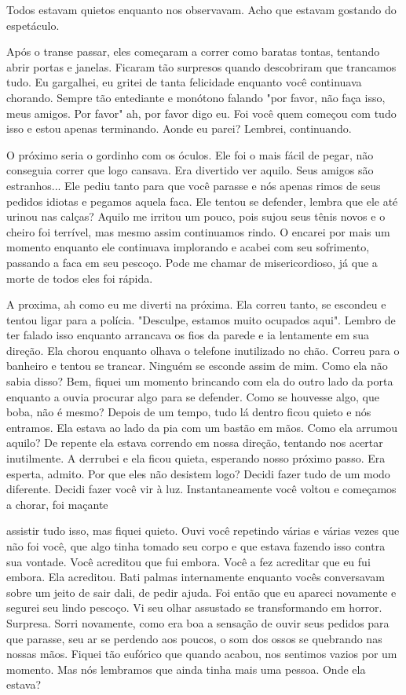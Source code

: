 \documentclass{book}
\begin{document}
\begin{multicols}{2}
 Todos estavam quietos enquanto nos observavam. Acho que estavam gostando do espetáculo.
 
 Após o transe passar, eles começaram a correr como baratas tontas, tentando abrir portas e janelas. Ficaram tão surpresos quando descobriram que trancamos tudo. Eu gargalhei, eu gritei de tanta felicidade enquanto você continuava chorando. Sempre tão entediante e monótono falando "por favor, não faça isso, meus amigos. Por favor" ah, por favor digo eu. Foi você quem começou com tudo isso e estou apenas terminando. Aonde eu parei? Lembrei, continuando.
 
 O próximo seria o gordinho com os óculos. Ele foi o mais fácil de pegar, não conseguia correr que logo cansava. Era divertido ver aquilo. Seus amigos são estranhos... Ele pediu tanto para que você parasse e nós apenas rimos de seus pedidos idiotas e pegamos aquela faca. Ele tentou se defender, lembra que ele até urinou nas calças? Aquilo me irritou um pouco, pois sujou seus tênis novos e o cheiro foi terrível, mas mesmo assim continuamos rindo. O encarei por mais um momento enquanto ele continuava implorando e acabei com seu sofrimento, passando a faca em seu pescoço. Pode me chamar de misericordioso, já que a morte de todos eles foi rápida.
 
 A proxima, ah como eu me diverti na próxima. Ela correu tanto, se escondeu e tentou ligar para a polícia. "Desculpe, estamos muito ocupados aqui". Lembro de ter falado isso enquanto arrancava os fios da parede e ia lentamente em sua direção. Ela chorou enquanto olhava o telefone inutilizado no chão. Correu para o banheiro e tentou se trancar. Ninguém se esconde assim de mim. Como ela não sabia disso? Bem, fiquei um momento brincando com ela do outro lado da porta enquanto a ouvia procurar algo para se defender. Como se houvesse algo, que boba, não é mesmo? Depois de um tempo, tudo lá dentro ficou quieto e nós entramos. Ela estava ao lado da pia com um bastão em mãos. Como ela arrumou aquilo? De repente ela estava correndo em nossa direção, tentando nos acertar inutilmente. A derrubei e ela ficou quieta, esperando nosso próximo passo. Era esperta, admito. Por que eles não desistem logo? Decidi fazer tudo de um modo diferente. Decidi fazer você vir à luz. Instantaneamente você voltou e começamos a chorar, foi maçante
 
 assistir tudo isso, mas fiquei quieto. Ouvi você repetindo várias e várias vezes que não foi você, que algo tinha tomado seu corpo e que estava fazendo isso contra sua vontade. Você acreditou que fui embora. Você a fez acreditar que eu fui embora. Ela acreditou. Bati palmas internamente enquanto vocês conversavam sobre um jeito de sair dali, de pedir ajuda. Foi então que eu apareci novamente e segurei seu lindo pescoço. Vi seu olhar assustado se transformando em horror. Surpresa. Sorri novamente, como era boa a sensação de ouvir seus pedidos para que parasse, seu ar se perdendo aos poucos, o som dos ossos se quebrando nas nossas mãos. Fiquei tão eufórico que quando acabou, nos sentimos vazios por um momento. Mas nós lembramos que ainda tinha mais uma pessoa. Onde ela estava?
 

\end{multicols}
\end{document}
